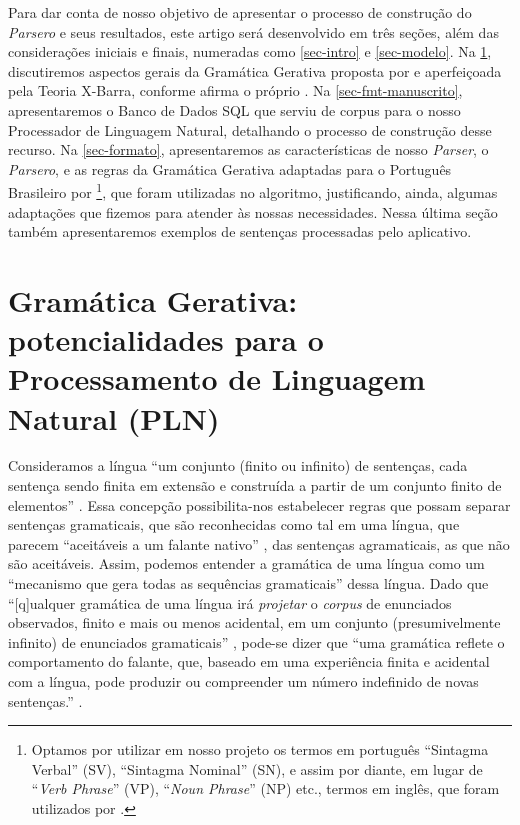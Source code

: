 \documentclass[portuguese]{textolivre}
\begin{document}
Para dar conta de nosso objetivo de apresentar o processo de construção do \textit{Parsero} e seus resultados, este artigo será desenvolvido em três seções, além das considerações iniciais e finais, numeradas como \cref{sec-intro} e \cref{sec-modelo}. Na \cref{sec-conduta}, discutiremos aspectos gerais da Gramática Gerativa proposta por \textcite{chomsky_estruturas_2015} e aperfeiçoada pela Teoria X-Barra, conforme afirma o próprio \textcite[p. 392]{chomsky__2014}. Na \cref{sec-fmt-manuscrito}, apresentaremos o Banco de Dados SQL que serviu de corpus para o nosso Processador de Linguagem Natural, detalhando o processo de construção desse recurso. Na \cref{sec-formato}, apresentaremos as características de nosso \textit{Parser}, o \textit{Parsero}, e as regras da Gramática Gerativa adaptadas para o Português Brasileiro por \textcite{othero_gramatica_2009}\footnote{Optamos por utilizar em nosso projeto os termos em português “Sintagma Verbal” (SV), “Sintagma Nominal” (SN), e assim por diante, em lugar de “\textit{Verb Phrase}” (VP), “\textit{Noun Phrase}” (NP) etc., termos em inglês, que foram utilizados por \textcite{othero_gramatica_2009}.}, que foram utilizadas no algoritmo, justificando, ainda, algumas adaptações que fizemos para atender às nossas necessidades. Nessa última seção também apresentaremos exemplos de sentenças processadas pelo aplicativo.

\section{Gramática Gerativa: potencialidades para o Processamento de Linguagem Natural (PLN)}\label{sec-conduta}
Consideramos a língua “um conjunto (finito ou infinito) de sentenças, cada sentença sendo finita em extensão e construída a partir de um conjunto finito de elementos” \cite[p. 18]{chomsky_estruturas_2015}. Essa concepção possibilita-nos estabelecer regras que possam separar sentenças gramaticais, que são reconhecidas como tal em uma língua, que parecem “aceitáveis a um falante nativo” \cite[p. 18]{chomsky_estruturas_2015}, das sentenças agramaticais, as que não são aceitáveis. Assim, podemos entender a gramática de uma língua como um “mecanismo que gera todas as sequências gramaticais” \cite[p. 18]{chomsky_estruturas_2015} dessa língua.  Dado que “[q]ualquer gramática de uma língua irá \textit{projetar} o \textit{corpus} de enunciados observados, finito e mais ou menos acidental, em um conjunto (presumivelmente infinito) de enunciados gramaticais” \cite[p. 19, grifos do autor]{chomsky_estruturas_2015}, pode-se dizer que “uma gramática reflete o comportamento do falante, que, baseado em uma experiência finita e acidental com a língua, pode produzir ou compreender um número indefinido de novas sentenças.” \cite[p. 19]{chomsky_estruturas_2015}.
\end{document}
